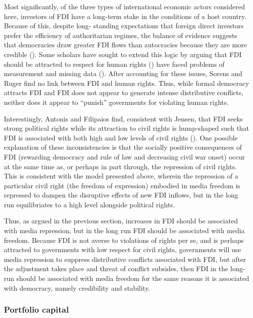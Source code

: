 \documentclass[12pt]{report}
\begin{document}
Most significantly, of the three types of international economic actors considered here, investors
of FDI have a long-term stake in the conditions of a host country. Because of this, despite long-
standing expectations that foreign direct investors prefer the efficiency of authoritarian regimes,
the balance of evidence suggests that democracies draw greater FDI flows than autocracies because
they are more credible (\citealt[588]{Jensen:2003to}). Some scholars have sought to extend this
logic by arguing that FDI should be attracted to respect for human rights (\citealt{Blanton:2007ep})
have faced problems of measurement and missing data (\citealt{Sorens:2012hc}). After accounting for
these issues, Sorens and Ruger find no link between FDI and human rights. Thus, while formal
democracy attracts FDI and FDI does not appear to generate intense distributive conflicts, neither
does it appear to ``punish'' governments for violating human rights.

Interestingly, Antonis and Filipaios find, consistent with Jensen, that FDI seeks strong political
rights while its attraction to civil rights is hump-shaped such that FDI is associated with both
high and low levels of civil rights (\citeyear{Adam:2007gn}). One possible explanation of these
inconsistencies is that the socially positive consequences of FDI (rewarding democracy and rule of
law and decreasing civil war onset) occur at the same time as, or perhaps in part through, the
repression of civil rights. This is consistent with the model presented above, wherein the
repression of a particular civil right (the freedom of expression) embodied in media freedom is
repressed to dampen the disruptive effects of new FDI inflows, but in the long run equilibriates to
a high level alongside political rights.

Thus, as argued in the previous section, increases in FDI should be associated with media
repression, but in the long run FDI should be associated with media freedom. Because FDI is not
averse to violations of rights per se, and is perhaps attracted to governments with low respect for
civil rights, governments will use media repression to suppress distributive conflicts associated
with FDI, but after the adjustment takes place and threat of conflict subsides, then FDI in the
long-run should be associated with media freedom for the same reasons it is associated with
democracy, namely credibility and stability.

\subsubsection{Portfolio capital}
\end{document}
